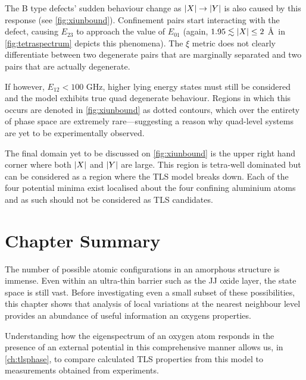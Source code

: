 The B type defects' sudden behaviour change as $\lvert X\rvert\rightarrow\lvert Y\rvert$ is also caused by this response (see \cref{fig:xiunbound}).
Confinement pairs start interacting with the defect, causing $E_{23}$ to approach the value of $E_{01}$ (again, $1.95 \lesssim \lvert X\rvert \leq 2$ \AA\ in \cref{fig:tetraspectrum} depicts this phenomena).
The $\xi$ metric does not clearly differentiate between two degenerate pairs that are marginally separated and two pairs that are actually degenerate.

If however, $E_{12} < 100$ GHz, higher lying energy states must still be considered and the model exhibits true quad degenerate behaviour.
Regions in which this occurs are denoted in \cref{fig:xiunbound} as dotted contours, which over the entirety of phase space are extremely rare---suggesting a reason why quad-level systems are yet to be experimentally observed.

The final domain yet to be discussed on \cref{fig:xiunbound} is the upper right hand corner where both $\lvert X\rvert$ and $\lvert Y\rvert$ are large.
This region is tetra-well dominated but can be considered as a region where the TLS model breaks down.
Each of the four potential minima exist localised about the four confining aluminium atoms and as such should not be considered as TLS candidates.

\section{Chapter Summary}

The number of possible atomic configurations in an amorphous structure is immense.
Even within an ultra-thin barrier such as the JJ oxide layer, the state space is still vast.
Before investigating even a small subset of these possibilities, this chapter shows that analysis of local variations at the nearest neighbour level provides an abundance of useful information an oxygens properties.

Understanding how the eigenspectrum of an oxygen atom responds in the presence of an external potential in this comprehensive manner allows us, in \cref{ch:tlsphase}, to compare calculated TLS properties from this model to measurements obtained from experiments.    